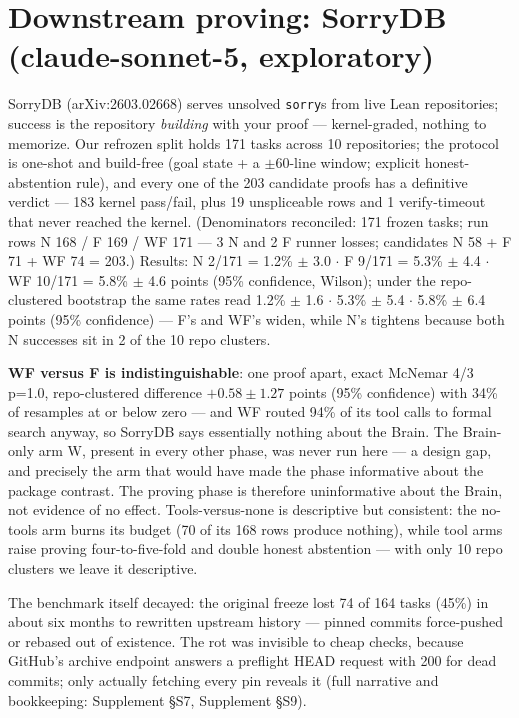 \documentclass[10pt]{article}
\newcommand{\code}[1]{\texttt{#1}}
\newcommand{\Ssec}[1]{Supplement \S #1}
\begin{document}
\section{Downstream proving: SorryDB (claude-sonnet-5, exploratory)}
\label{sec:sorrydb}

SorryDB (arXiv:2603.02668) serves unsolved \code{sorry}s from live Lean
repositories; success is the repository \emph{building} with your
proof --- kernel-graded, nothing to memorize. Our refrozen split holds
171 tasks across 10 repositories; the protocol is one-shot and
build-free (goal state + a $\pm$60-line window; explicit
honest-abstention rule), and every one of the 203 candidate proofs has a
definitive verdict --- 183 kernel pass/fail, plus 19 unspliceable rows
and 1 verify-timeout that never reached the kernel. (Denominators
reconciled: 171 frozen tasks; run rows N 168 / F 169 / WF 171 --- 3 N
and 2 F runner losses; candidates N 58 + F 71 + WF 74 = 203.) Results:
N 2/171 = 1.2\% $\pm$ 3.0 $\cdot$ F 9/171 = 5.3\% $\pm$ 4.4
$\cdot$ WF 10/171 = 5.8\% $\pm$ 4.6 points (95\% confidence,
Wilson); under the repo-clustered bootstrap the same rates read 1.2\%
$\pm$ 1.6 $\cdot$ 5.3\% $\pm$ 5.4 $\cdot$ 5.8\% $\pm$ 6.4 points
(95\% confidence) --- F's and WF's widen, while N's tightens because
both N successes sit in 2 of the 10 repo clusters.

\textbf{WF versus F is indistinguishable}: one proof apart, exact
McNemar 4/3 p=1.0, repo-clustered difference
$+0.58 \pm 1.27$ points (95\% confidence) with 34\% of resamples at
or below zero --- and WF routed 94\% of its
tool calls to formal search anyway, so SorryDB says essentially nothing
about the Brain. The Brain-only arm W, present in every other phase, was
never run here --- a design gap, and precisely the arm that would have
made the phase informative about the package contrast. The proving phase
is therefore uninformative about the Brain, not evidence of no effect.
Tools-versus-none is descriptive but consistent: the no-tools arm burns
its budget (70 of its 168 rows produce nothing), while tool arms raise
proving four-to-five-fold and double honest abstention --- with only 10
repo clusters we leave it descriptive.

The benchmark itself decayed: the original freeze lost 74 of 164 tasks
(45\%) in about six months to rewritten upstream history --- pinned
commits force-pushed or rebased out of existence. The rot was invisible
to cheap checks, because GitHub's archive endpoint answers a preflight
HEAD request with 200 for dead commits; only actually fetching every pin
reveals it (full narrative and bookkeeping: \Ssec{S7}, \Ssec{S9}).
\end{document}

